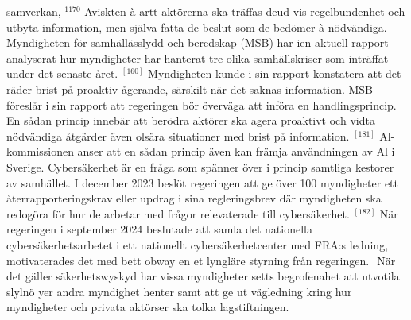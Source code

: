 {{{{{{{{{{{samverkan, \({ }^{1170}\) Aviskten à artt aktörerna ska träffas
deud vis regelbundenhet och utbyta information, men själva fatta de beslut som de bedömer à nödvändiga.
Myndigheten för samhällässlydd och beredskap (MSB) har ien aktuell rapport analyserat hur myndigheter har hanterat tre olika samhällskriser som inträffat under det senaste året. \({ }^{[160]}\) Myndigheten kunde i sin rapport konstatera att det räder brist på proaktiv ågerande, särskilt när det saknas information. MSB föreslår i sin rapport att regeringen bör överväga att införa en handlingsprincip. En sådan princip innebär att berödra aktörer ska agera proaktivt och vidta nödvändiga åtgärder även olsära situationer med brist på information. \({ }^{[181]}\) Al-kommissionen anser att en sådan princip även kan främja användningen av Al i Sverige.
Cybersäkerhet är en fråga som spänner över i princip samtliga kestorer av samhället. I december 2023 beslöt regeringen att ge över 100 myndigheter ett återrapporteringskrav eller updrag i sina regleringsbrev där myndigheten ska redogöra för hur de arbetar med frågor relevaterade till cybersäkerhet. \({ }^{[182]}\) När regeringen i september 2024 beslutade att samla det nationella cybersäkerhetsarbetet i ett nationellt cybersäkerhetcenter med FRA:s ledning, motivaterades det med bett obway en et lyngläre styrning från regeringen. \({ }^{}\) När det gäller säkerhetswyskyd har vissa myndigheter setts begrofenahet att utvotila slylnö yer andra myndighet henter samt att ge ut vägledning kring hur myndigheter och privata aktörser ska tolka lagstiftningen. \({ }^{}\)
}}}}}}}}}}}
